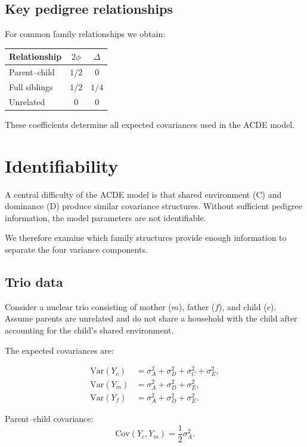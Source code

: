 \documentclass[11pt]{article}
\begin{document}
\subsection{Key pedigree relationships}

For common family relationships we obtain:

\begin{center}
\begin{tabular}{lcc}
Relationship & $2\phi$ & $\Delta$\\
\hline
Parent--child & $1/2$ & $0$\\
Full siblings & $1/2$ & $1/4$\\
Unrelated & $0$ & $0$
\end{tabular}
\end{center}

These coefficients determine all expected covariances used in the ACDE model.

\section{Identifiability}

A central difficulty of the ACDE model is that shared environment (C) and 
dominance (D) produce similar covariance structures. Without sufficient 
pedigree information, the model parameters are not identifiable.

We therefore examine which family structures provide enough information to 
separate the four variance components.

\subsection{Trio data}

Consider a nuclear trio consisting of mother ($m$), father ($f$), and child ($c$).  
Assume parents are unrelated and do not share a household with the child 
after accounting for the child's shared environment.

The expected covariances are:

\begin{align}
\mathrm{Var}(Y_c) &= \sigma_A^2 + \sigma_D^2 + \sigma_C^2 + \sigma_E^2,\\
\mathrm{Var}(Y_m) &= \sigma_A^2 + \sigma_D^2 + \sigma_E^2,\\
\mathrm{Var}(Y_f) &= \sigma_A^2 + \sigma_D^2 + \sigma_E^2.
\end{align}

Parent--child covariance:
\begin{equation}
\mathrm{Cov}(Y_c,Y_m) = \frac{1}{2}\sigma_A^2.
\end{equation}
\end{document}
